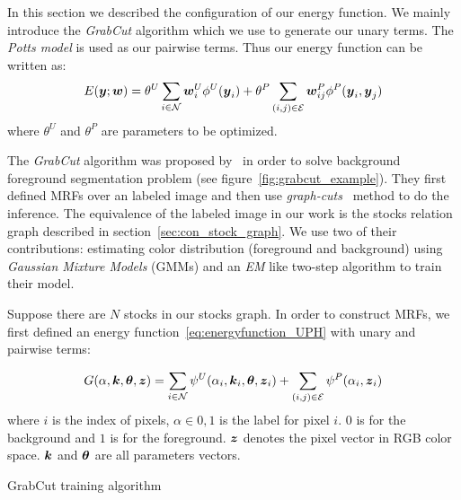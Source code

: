 In this section we described the configuration of our energy
function. We mainly introduce the \emph{GrabCut} algorithm which
we use to generate our unary terms. The \emph{Potts model} is
used as our pairwise terms. Thus our energy function can be
written as:
\begin{align}
  \label{eq:energyfunction_UP}
  E(\by;\bw)=\theta^U\sum_{i\in \N}{\bw_i^U\phi^U(\by_i)}+
  \theta^P\sum_{(i,j)\in \E}{\bw_{ij}^P\phi^P(\by_i,\by_j)}
\end{align}
\noindent where $\theta^U$ and $\theta^P$ are parameters to be
optimized.

The \emph{GrabCut} algorithm was proposed
by~ in order to solve background
foreground segmentation problem (see
figure~\ref{fig:grabcut_example}). They first defined MRFs over
an labeled image and then use
\emph{graph-cuts}~\cite{Boykov:ICCV01} method to do the
inference. The equivalence of the labeled image in our work is
the stocks relation graph described in
section~\ref{sec:con_stock_graph}. We use two of their
contributions: estimating color distribution (foreground and
background) using \emph{Gaussian Mixture Models} (GMMs) and an
\emph{EM} like two-step algorithm to train their model.

Suppose there are $N$ stocks in our stocks graph. In order to
construct MRFs, we first defined an energy
function~\eqref{eq:energyfunction_UPH} with unary and pairwise
terms:

\begin{align}
  \label{eq:grabcut_energy}
  G(\alpha, \bk, \btheta, \bz) = 
  \sum_{i\in \N}{\psi^U(\alpha_i, \bk_i, \btheta, \bz_i)}+
  \sum_{(i,j)\in \E}{\psi^P(\alpha_i,\bz_i)}
\end{align}
where $i$ is the index of pixels, $\alpha \in {0,1}$ is the label
for pixel $i$. $0$ is for the background and $1$ is for the
foreground. ${\boldsymbol{z}}$ denotes the pixel vector in RGB color space.
${\boldsymbol{k}}$ and $\boldsymbol{\theta}$ are all parameters vectors.

\begin{algorithm}[tb]
  \begin{algorithmic}[1]
    \REPEAT
  \end{algorithmic}
  \caption{\label{alg:grabcut} GrabCut training algorithm}
\end{algorithm}

